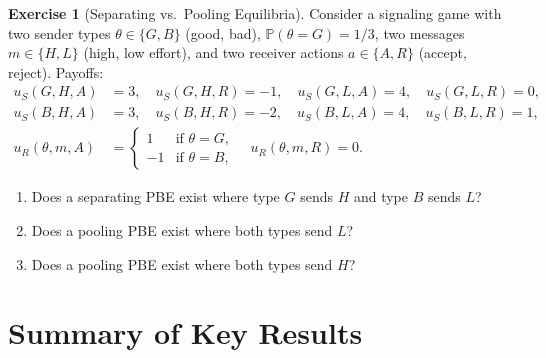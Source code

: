 \documentclass[11pt,a4paper]{article}
\theoremstyle{definition}
\newtheorem{exercise}{Exercise}[section]
\theoremstyle{plain}
\theoremstyle{remark}
\newcommand{\Prob}{\mathbb{P}}
\begin{document}
\begin{exercise}[Separating vs.\ Pooling Equilibria]
\label{ex:signaling}
Consider a signaling game with two sender types $\theta \in \{G, B\}$ (good, bad),
$\Prob(\theta = G) = 1/3$, two messages $m \in \{H, L\}$ (high, low effort), and two
receiver actions $a \in \{A, R\}$ (accept, reject). Payoffs:
\begin{align*}
    u_S(G, H, A) &= 3, \quad u_S(G, H, R) = -1, \quad u_S(G, L, A) = 4, \quad
    u_S(G, L, R) = 0, \\
    u_S(B, H, A) &= 3, \quad u_S(B, H, R) = -2, \quad u_S(B, L, A) = 4, \quad
    u_S(B, L, R) = 1, \\
    u_R(\theta, m, A) &= \begin{cases} 1 & \text{if } \theta = G, \\
    -1 & \text{if } \theta = B, \end{cases} \quad
    u_R(\theta, m, R) = 0.
\end{align*}
\begin{enumerate}[label=(\alph*)]
    \item Does a separating PBE exist where type $G$ sends $H$ and type $B$ sends $L$?
    \item Does a pooling PBE exist where both types send $L$?
    \item Does a pooling PBE exist where both types send $H$?
\end{enumerate}
\end{exercise}


\section{Summary of Key Results}
\label{sec:summary}
\end{document}

